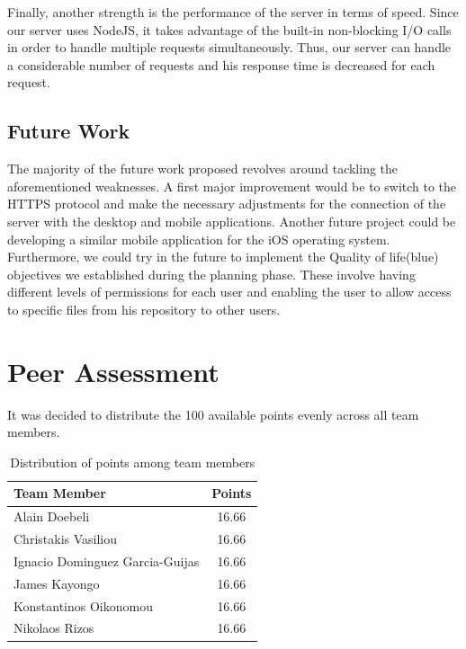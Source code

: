 \documentclass[11pt]{article}
\begin{document}
Finally, another strength is the performance of the server in terms of speed. Since our server uses NodeJS, it takes advantage of the built-in non-blocking I/O calls in order to handle multiple requests simultaneously. Thus, our server can handle a considerable number of requests and his response time is decreased for each request.

\subsection{Future Work}

The majority of the future work proposed revolves around tackling the aforementioned weaknesses. A first major improvement would be to switch to the HTTPS protocol and make the necessary adjustments for the connection of the server with the desktop and mobile applications. Another future project could be developing a similar mobile application for the iOS operating system. Furthermore, we could try in the future to implement the Quality of life(blue) objectives we established during the planning phase. These involve having different levels of permissions for each user and enabling the user to allow access to specific files from his repository to other users.


\section{Peer Assessment}

It was decided to distribute the 100 available points evenly across all team members.

\begin{table}[H]
	\centering
	\begin{tabular}{lc}
		\hline
		\textbf{Team Member} & \textbf{Points} \\
		\hline
		Alain Doebeli & 16.66 \\
		Christakis Vasiliou & 16.66 \\
		Ignacio Dominguez Garcia-Guijas & 16.66 \\
		James Kayongo & 16.66 \\
		Konstantinos Oikonomou & 16.66 \\
		Nikolaos Rizos & 16.66 \\
		\hline
	\end{tabular}
	\caption{Distribution of points among team members}
	\label{tab:points}
\end{table}
\end{document}
